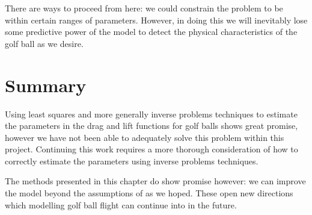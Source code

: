 There are ways to proceed from here: we
could constrain the problem to be within certain ranges of parameters. However, in doing this we
will inevitably lose some predictive power of the model to detect the physical characteristics of the
golf ball as we desire.
\section{Summary}

Using least squares and more generally inverse problems techniques to estimate the parameters in 
the drag and lift functions for golf balls shows great promise, however we have not been able to 
adequately solve this problem within this project. Continuing this work requires a more thorough
consideration of how to correctly estimate the parameters using inverse problems techniques.

The methods presented in this chapter do show promise however: we can improve the model beyond the
assumptions of \citet{Robinson2013} as we hoped. These open new directions which modelling golf ball
flight can continue into in the future.